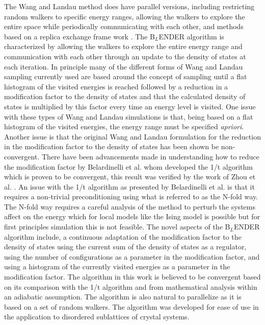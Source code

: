 \documentclass[aps,pre,reprint,superscriptaddress,showkeys]{revtex4-1}
\begin{document}
    The Wang and Landau method does have parallel versions, including  restricting random walkers to specific energy ranges, allowing the walkers to explore the entire space while periodically communicating with each other, and methods based on a replica exchange frame work \cite{MP_Wang_Landau,P_imp_Wang_Landau, Hframe_Wang_Landau, Scalable_replica_exchange}.  The B$_{L}$ENDER algorithm is characterized by allowing the walkers to explore the entire energy range and communication with each other through an update to the density of states at each iteration.  In principle many of the different forms of  Wang and Landau sampling currently used are based around the concept of sampling until a flat histogram of the visited energies is reached followed by a reduction in a modification factor to the density of states and that the calculated density of states  is multiplied by this factor every time an energy level  is visited.  One issue with these types of Wang and Landau simulations is that, being based on a flat histogram of the visited energies, the energy range must be specified \textit{apriori}. Another issue is that the original Wang and Landau formulation for the reduction in the modification factor to the  density of states has been shown be non-convergent\cite{Non_convergent_WL,Non_convergent_WL_2,non_convergence_multiple_random_walkers,Optimal_modification}.   There have been advancements made in understanding how to reduce the modification factor by Belardinelli et al. \cite{saturation} whom developed the 1/t algorithm which is proven to be convergent, this result was verified by the work of Zhou et al. \cite{Optimal_modification}. An issue with the 1/t algorithm as presented by Belardinelli et al. is that it requires a non-trivial preconditioning using what is referred to as the N-fold way. The N-fold way requires a careful analysis of the  method to perturb the systems affect on the energy which for local models like the Ising model is possible but for first principles simulation this is not feasible. The novel aspects of the B$_{L}$ENDER algorithm include, a continuous adaptation of the modification factor to the  density of states using the current sum of the density of states as a regulator, using the number of configurations as a parameter in the modification factor, and using a histogram of the currently visited energies as a parameter in the modification factor.  The algorithm in this work is believed to be convergent based on its comparison with the 1/t algorithm and from mathematical analysis within an adiabatic assumption. The algorithm is also natural to parallelize as it is based on a set of random walkers. The algorithm was developed for ease of use in the application to disordered sublattices of crystal systems. 
\end{document}
